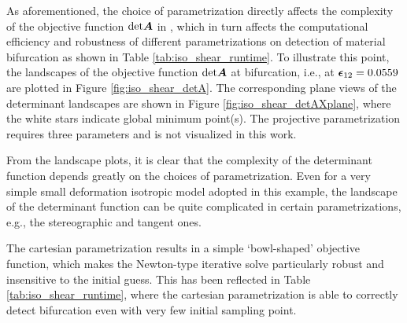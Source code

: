 \documentclass[12pt]{article}
\numberwithin{equation}{section}
\begin{document}
As aforementioned, the choice of parametrization directly affects the 
complexity of the objective function ${\rm det}{\boldsymbol{A}}$ in 
, which in turn affects the 
computational efficiency and robustness of different parametrizations 
on detection of material bifurcation as shown in 
Table \ref{tab:iso_shear_runtime}. To illustrate this point, the 
landscapes of the objective function ${\rm det}{\boldsymbol{A}}$ at bifurcation, 
i.e., at ${\boldsymbol{\epsilon}}_{12}=0.0559$ are plotted in 
Figure  \ref{fig:iso_shear_detA}. The corresponding plane views of the 
determinant landscapes are shown in 
Figure \ref{fig:iso_shear_detAXplane}, where the white stars indicate 
global minimum point(s). The projective parametrization requires three parameters and is not visualized in this work.

From the landscape plots, it is clear that the complexity of the 
determinant function depends greatly on the choices of 
parametrization. Even for a very simple small deformation isotropic 
model adopted in this example, the landscape of the determinant 
function can be quite complicated in certain parametrizations, e.g., 
the stereographic and tangent ones. 

The cartesian parametrization results in a simple `bowl-shaped' 
objective function, which makes the Newton-type iterative solve 
particularly robust and insensitive to the initial guess. This has 
been reflected in Table \ref{tab:iso_shear_runtime}, where the 
cartesian parametrization is able to correctly detect bifurcation even 
with very few initial sampling point. 
\end{document}
